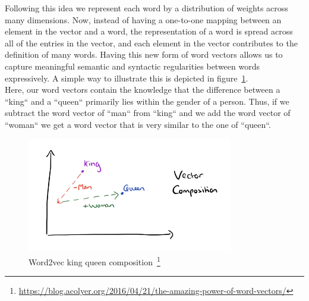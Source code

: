 Following this idea we represent each word by a distribution of weights across many dimensions. Now, instead of having a one-to-one mapping between an element in the vector and a word, the representation of a word is spread across all of the entries in the vector, and each element in the vector contributes to the definition of many words. Having this new form of word vectors allows us to capture meaningful semantic and syntactic regularities between words expressively. A simple way to illustrate this is depicted in figure~\ref{fig:word2vec_king_queen_composition}. \\
Here, our word vectors contain the knowledge that the difference between a “king“ and a “queen“ primarily lies within the gender of a person. Thus, if we subtract the word vector of “man“ from “king“ and we add the word vector of “woman“ we get a word vector that is very similar to the one of “queen“.

\begin{figure}[h]
  \includegraphics[height=5cm]{img/word2vec-king-queen-composition}
  \caption[Word2vec king queen composition]{Word2vec king queen composition~\footnote{\url{https://blog.acolyer.org/2016/04/21/the-amazing-power-of-word-vectors/}}}
\label{fig:word2vec_king_queen_composition}
\end{figure}

